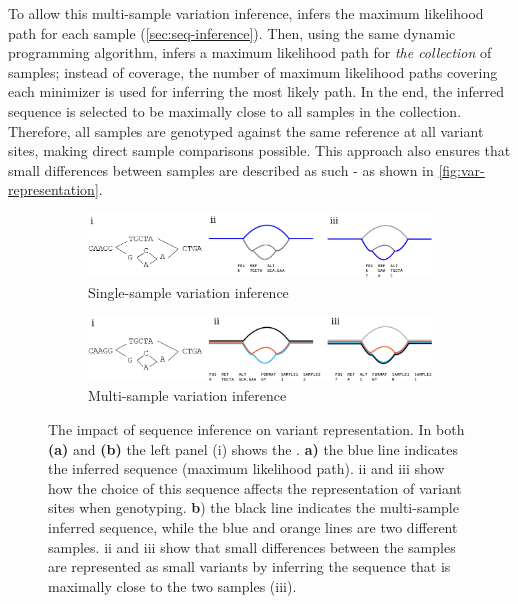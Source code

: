 To allow this multi-sample variation inference, \pandora{} infers the maximum likelihood path for each sample (\autoref{sec:seq-inference}). Then, using the same dynamic programming algorithm, \pandora{} infers a maximum likelihood path for \emph{the collection} of samples; instead of \kmer{} coverage, the number of maximum likelihood paths covering each minimizer is used for inferring the most likely path. In the end, the inferred sequence is selected to be maximally close to all samples in the collection. Therefore, all samples are genotyped against the same reference at all variant sites, making direct sample comparisons possible. This approach also ensures that small differences between samples are described as such - as shown in \autoref{fig:var-representation}.

\begin{figure}
     \centering
     \begin{subfigure}[b]{0.95\textwidth}
        \includegraphics[width=0.95\columnwidth]{Chapter0/Figs/map_variation_representation.png}
        \centering
        \caption{Single-sample variation inference}
        \label{fig:map-var-representation}
     \end{subfigure}
     \begin{subfigure}[b]{0.95\textwidth}
         \centering
        \includegraphics[width=0.95\columnwidth]{Chapter0/Figs/variant_representation.png}
         \caption{Multi-sample variation inference}
         \label{fig:var-representation}
     \end{subfigure}
     \caption{The impact of sequence inference on variant representation. In both \textbf{(a)} and \textbf{(b)} the left panel (i) shows the \prg{}. \textbf{a)} the blue line indicates the inferred sequence (maximum likelihood path). ii and iii show how the choice of this sequence affects the representation of variant sites when genotyping. \textbf{b}) the black line indicates the multi-sample inferred sequence, while the blue and orange lines are two different samples. ii and iii show that small differences between the samples are represented as small variants by inferring the sequence that is maximally close to the two samples (iii).}
     \label{fig:pandora-var-representation}
\end{figure}

